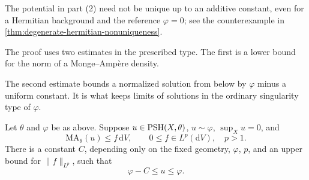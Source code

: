 The potential in part (2) need not be unique up to an additive constant, even for a Hermitian background and the reference $\varphi=0$; see the counterexample in \cref{thm:degenerate-hermitian-nonuniqueness}.

The proof uses two estimates in the prescribed type. The first is a lower bound for the norm of a Monge--Amp\`ere density.



The second estimate bounds a normalized solution from below by $\varphi$ minus a uniform constant. It is what keeps limits of solutions in the ordinary singularity type of $\varphi$.

\begin{theorem}\label{thm:relative-linfty}
Let $\theta$ and $\varphi$ be as above. Suppose $u\in\mathrm{PSH}(X,\theta)$, $u\sim\varphi$, $\sup_Xu=0$, and
\[
 \mathrm{MA}_\theta(u)\leq f\,\mathrm{d}V,
 \qquad0\leq f\in L^p(\mathrm{d}V),\quad p>1.
\]
There is a constant $C$, depending only on the fixed geometry, $\varphi$, $p$, and an upper bound for $\|f\|_{L^p}$, such that
\[
 \varphi-C\leq u\leq\varphi.
\]
\end{theorem}

